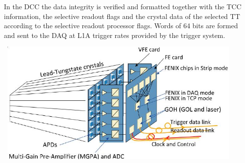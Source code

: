 \newline
In the DCC the data integrity is verified and formatted together with the TCC information, the selective readout flags and the crystal data of the selected TT according to the selective readout processor flags. Words of 64 bits are formed and sent to the DAQ at L1A trigger rates provided by the trigger system.

\vspace{5mm}

\begin{minipage}{0.99\textwidth} 
\begin{center}
\mbox{
\includegraphics[height=0.6\textwidth, width=0.9\textwidth]{THESISPLOTS/ECAL-FRONT-END-ELECTRONICS.jpg}
} 
\label{fig:readout2}
\end{center}
\end{minipage}


